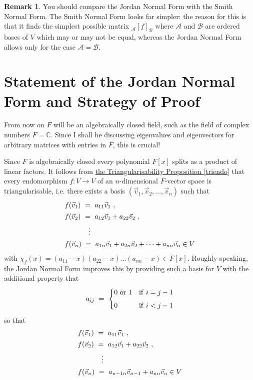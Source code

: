 \documentclass[11pt]{amsbook}
\def\CC{{\mathbb C}}
\theoremstyle{definition}
\newtheorem{rem}[theorem]{Remark}
\begin{document}
\begin{rem} You should compare the Jordan Normal Form with the Smith Normal Form. The Smith Normal Form looks far simpler: the reason for this is that it finds the simplest possible matrix ${}_{\mathcal{A}}[f]_{\mathcal{B}}$ where $\mathcal{A}$ and $\mathcal{B}$ are ordered bases of $V$ which may or may not be equal, whereas the Jordan Normal Form allows only for the case $\mathcal{A} = \mathcal{B}$.
\end{rem}

\section{Statement of the Jordan Normal Form and Strategy of Proof}
From now on $F$ will be an algebraically closed field, such as the field of complex numbers $F=\CC$. Since I shall be discussing eigenvalues and eigenvectors for arbitrary matrices with entries in $F$, this is crucial!


Since $F$ is algebraically closed every polynomial $F[x]$ splits as a product of linear factors. It follows from \hyperref[triendo]{the Triangularisability Proposition \ref{triendo}} that every endomorphism $f:V \to V$ of an $n$-dimensional $F$-vector space is triangularisable, i.e. there exists a basis $(\vec{v}_1,\vec{v}_2,\dots,\vec{v}_n)$ such that
$$\begin{array}{l}
f(\vec{v}_1)~=~a_{11}\vec{v}_1~,\\[1ex]
f(\vec{v}_2)~=~a_{12}\vec{v}_1+a_{22}\vec{v}_2~,\\[1ex]
\hskip12mm \vdots \\[1ex]
f(\vec{v}_n)~=~a_{1n}\vec{v}_1+a_{2n}\vec{v}_2+\dots+a_{nn}\vec{v}_n \in V
\end{array}$$
with $\chi_f(x)=(a_{11}-x)(a_{22}-x)\dots (a_{nn}-x) \in F[x]$.
Roughly speaking, the Jordan Normal Form improves this by providing such a basis for $V$ with the additional property that 
$$a_{ij}~=~\begin{cases} 
0~{\rm or}~1&{\rm if}~i=j-1\\[1ex]
0 &{\rm  if}~ i<j-1
\end{cases}$$
so that
$$\begin{array}{l}
f(\vec{v}_1)~=~a_{11}\vec{v}_1~,\\[1ex]
f(\vec{v}_2)~=~a_{12}\vec{v}_1+a_{22}\vec{v}_2~,\\[1ex]
\hskip12mm \vdots \\[1ex]
f(\vec{v}_n)~=~a_{{n-1}n}\vec{v}_{n-1}+a_{nn}\vec{v}_n \in V
\end{array}$$
\end{document}
